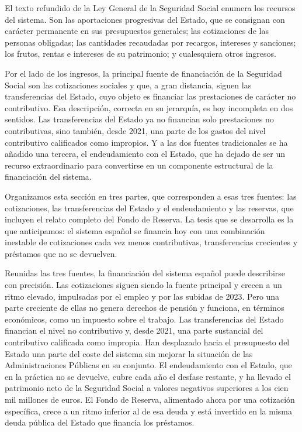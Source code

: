 \documentclass[10pt,a4paper]{article}
\begin{document}
El texto refundido de la Ley General de la Seguridad Social enumera los recursos del sistema. Son las aportaciones progresivas del Estado, que se consignan con carácter permanente en sus presupuestos generales; las cotizaciones de las personas obligadas; las cantidades recaudadas por recargos, intereses y sanciones; los frutos, rentas e intereses de su patrimonio; y cualesquiera otros ingresos. 

Por el lado de los ingresos, la principal fuente de financiación de la Seguridad Social son las cotizaciones sociales y que, a gran distancia, siguen las transferencias del Estado, cuyo objeto es financiar las prestaciones de carácter no contributivo. Esa descripción, correcta en su jerarquía, es hoy incompleta en dos sentidos. Las transferencias del Estado ya no financian solo prestaciones no contributivas, sino también, desde 2021, una parte de los gastos del nivel contributivo calificados como impropios. Y a las dos fuentes tradicionales se ha añadido una tercera, el endeudamiento con el Estado, que ha dejado de ser un recurso extraordinario para convertirse en un componente estructural de la financiación del sistema.

Organizamos esta sección en tres partes, que corresponden a esas tres fuentes: las cotizaciones, las transferencias del Estado y el endeudamiento y las reservas, que incluyen el relato completo del Fondo de Reserva. La tesis que se desarrolla es la que anticipamos: el sistema español se financia hoy con una combinación inestable de cotizaciones cada vez menos contributivas, transferencias crecientes y préstamos que no se devuelven. 

Reunidas las tres fuentes, la financiación del sistema español puede describirse con precisión. Las cotizaciones siguen siendo la fuente principal y crecen a un ritmo elevado, impulsadas por el empleo y por las subidas de 2023. Pero una parte creciente de ellas no genera derechos de pensión y funciona, en términos económicos, como un impuesto sobre el trabajo. Las transferencias del Estado financian el nivel no contributivo y, desde 2021, una parte sustancial del contributivo calificada como impropia. Han desplazado hacia el presupuesto del Estado una parte del coste del sistema sin mejorar la situación de las Administraciones Públicas en su conjunto. El endeudamiento con el Estado, que en la práctica no se devuelve, cubre cada año el desfase restante, y ha llevado el patrimonio neto de la Seguridad Social a valores negativos superiores a los cien mil millones de euros. El Fondo de Reserva, alimentado ahora por una cotización específica, crece a un ritmo inferior al de esa deuda y está invertido en la misma deuda pública del Estado que financia los préstamos.
\end{document}

